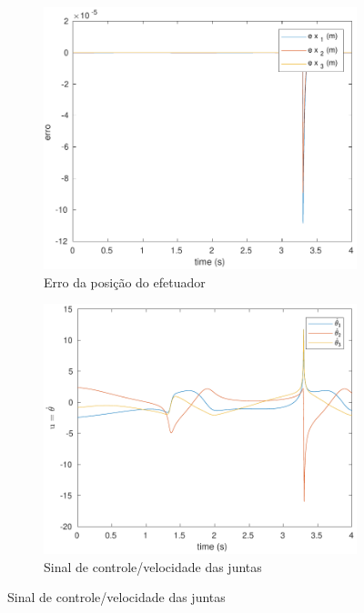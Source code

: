 \documentclass[a4paper,11pt]{article}
\theoremstyle{mytheor}
\begin{document}
\begin{figure}[!ht]
\begin{minipage}{\linewidth}
\begin{subfigure}[b]{0.49\textwidth}
    \includegraphics[width=1\textwidth]{figs/ex2_2b_e.pdf}
    \caption{Erro da posição do efetuador}
    \label{fig:ex2_2b_e}
    \end{subfigure}
  \end{minipage}
  \begin{minipage}{\linewidth}
  \centering
    \begin{subfigure}[b]{0.49\textwidth}
    \includegraphics[width=1\textwidth]{figs/ex2_2b_dq.pdf}
    \caption{Sinal de controle/velocidade das juntas}
    \label{fig:ex2_2b_dq}
    \end{subfigure}

\end{minipage}
\end{figure}
\end{document}
